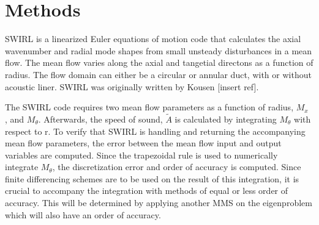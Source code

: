 \section{Methods}

SWIRL is a linearized Euler equations of motion code that calculates the 
axial wavenumber and radial mode shapes from small unsteady disturbances in a mean flow. 
The mean flow varies along the axial and tangetial directons as a function of 
radius. The flow domain can either be a circular or annular duct, with or without
acoustic liner. SWIRL was originally written by Kousen [insert ref].

The SWIRL code requires two mean flow parameters as a function of radius, $M_x$
, and $M_{\theta}$. Afterwards, the speed of sound, $\widetilde{A}$ is calculated by 
integrating $M_{\theta}$ with respect to r. To verify that SWIRL is handling 
and returning the accompanying mean flow parameters, the error between the 
mean flow input and output variables are computed. Since the trapezoidal rule
is used to numerically integrate $M_{\theta}$, the discretization error and 
order of accuracy is computed. Since finite differencing schemes are to be used 
on the result of this integration, it is crucial to accompany the integration 
with methods of equal or less order of accuracy. This will be determined by 
applying another MMS on the eigenproblem which will also have an order of 
accuracy.

